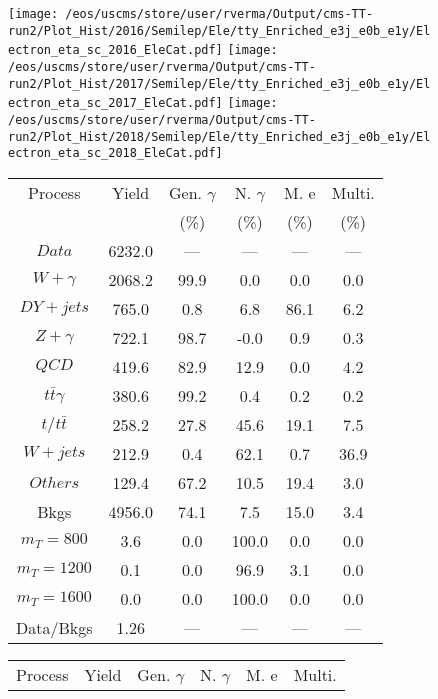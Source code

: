 \begin{figure}
\centering
\texttt{[image: /eos/uscms/store/user/rverma/Output/cms-TT-run2/Plot\_Hist/2016/Semilep/Ele/tty\_Enriched\_e3j\_e0b\_e1y/Electron\_eta\_sc\_2016\_EleCat.pdf]}
\texttt{[image: /eos/uscms/store/user/rverma/Output/cms-TT-run2/Plot\_Hist/2017/Semilep/Ele/tty\_Enriched\_e3j\_e0b\_e1y/Electron\_eta\_sc\_2017\_EleCat.pdf]}
\texttt{[image: /eos/uscms/store/user/rverma/Output/cms-TT-run2/Plot\_Hist/2018/Semilep/Ele/tty\_Enriched\_e3j\_e0b\_e1y/Electron\_eta\_sc\_2018\_EleCat.pdf]}
\begin{minipage}[c]{0.32\textwidth}
\centering
\tiny{
\begin{tabular}{cccccc}
\hline
Process & Yield & Gen. $\gamma$ & N. $\gamma$ & M. e & Multi. \\
 &  & (\%) & (\%) & (\%) & (\%)  \\
\hline
                                                                      $ Data $ &  6232.0 &  --- &  --- &  --- &  ---\\
$ W+\gamma $ &  2068.2 &  99.9 &  0.0 &  0.0 &  0.0\\
$ DY+jets $ &  765.0 &  0.8 &  6.8 &  86.1 &  6.2\\
$ Z+\gamma $ &  722.1 &  98.7 &  -0.0 &  0.9 &  0.3\\
$ QCD $ &  419.6 &  82.9 &  12.9 &  0.0 &  4.2\\
$ t\bar{t}\gamma $ &  380.6 &  99.2 &  0.4 &  0.2 &  0.2\\
$ t/t\bar{t} $ &  258.2 &  27.8 &  45.6 &  19.1 &  7.5\\
$ W+jets $ &  212.9 &  0.4 &  62.1 &  0.7 &  36.9\\
$ Others $ &  129.4 &  67.2 &  10.5 &  19.4 &  3.0\\
Bkgs &  4956.0 &  74.1 &  7.5 &  15.0 &  3.4\\
$ m_{T} = 800 $ &  3.6 &  0.0 &  100.0 &  0.0 &  0.0\\
$ m_{T} = 1200 $ &  0.1 &  0.0 &  96.9 &  3.1 &  0.0\\
$ m_{T} = 1600 $ &  0.0 &  0.0 &  100.0 &  0.0 &  0.0\\
Data/Bkgs &  1.26 &  --- &  --- &  --- &  ---\\
\hline
\end{tabular}
}
\end{minipage}
\begin{minipage}[c]{0.32\textwidth}
\centering
\tiny{
\begin{tabular}{cccccc}
\hline
Process & Yield & Gen. $\gamma$ & N. $\gamma$ & M. e & Multi. \\

\end{tabular}}
\end{minipage}
\end{figure}
